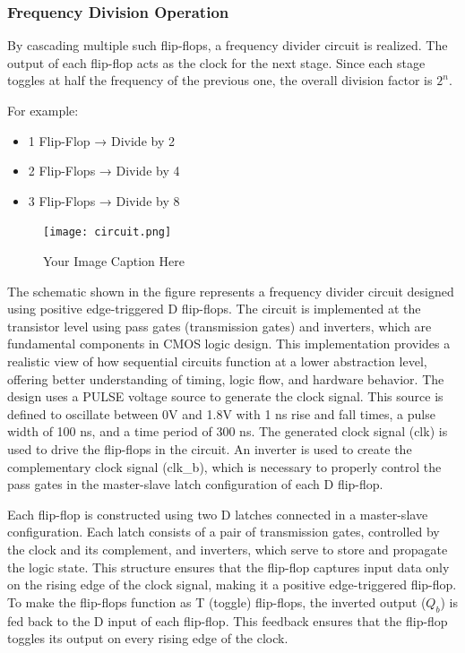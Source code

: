 \subsubsection*{Frequency Division Operation}
By cascading multiple such flip-flops, a frequency divider circuit is realized. The output of each flip-flop acts as the clock for the next stage. Since each stage toggles at half the frequency of the previous one, the overall division factor is \(2^n\).

For example:
\begin{itemize}
    \item 1 Flip-Flop → Divide by 2
    \item 2 Flip-Flops → Divide by 4
    \item 3 Flip-Flops → Divide by 8
\end{itemize}
\begin{figure}[H] %
    \centering
    \texttt{[image: circuit.png]}
    \caption{Your Image Caption Here}
    \label{fig:LT Spice Circuit}
\end{figure}
The schematic shown in the figure represents a frequency divider circuit designed using positive edge-triggered D flip-flops. The circuit is implemented at the transistor level using pass gates (transmission gates) and inverters, which are fundamental components in CMOS logic design. This implementation provides a realistic view of how sequential circuits function at a lower abstraction level, offering better understanding of timing, logic flow, and hardware behavior.
The design uses a PULSE voltage source to generate the clock signal. This source is defined to oscillate between 0V and 1.8V with 1 ns rise and fall times, a pulse width of 100 ns, and a time period of 300 ns. The generated clock signal (clk) is used to drive the flip-flops in the circuit. An inverter is used to create the complementary clock signal (clk\_b), which is necessary to properly control the pass gates in the master-slave latch configuration of each D flip-flop.

Each flip-flop is constructed using two D latches connected in a master-slave configuration. Each latch consists of a pair of transmission gates, controlled by the clock and its complement, and inverters, which serve to store and propagate the logic state. This structure ensures that the flip-flop captures input data only on the rising edge of the clock signal, making it a positive edge-triggered flip-flop. To make the flip-flops function as T (toggle) flip-flops, the inverted output (\(Q_b\)) is fed back to the D input of each flip-flop. This feedback ensures that the flip-flop toggles its output on every rising edge of the clock.

